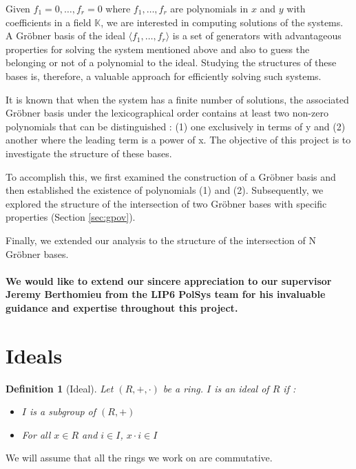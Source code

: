 \documentclass{article}
\newtheorem{definition}{Definition}[section]
\begin{document}
\par Given $f_{1}=0,\dots,f_{r}=0$ where $f_{1},\dots,f_{r}$ are polynomials in $x$ and $y$ with coefficients in a field $\mathbb{K}$, we are interested in computing solutions of the systems. A Gröbner basis of the ideal $\langle f_{1},\dots,f_{r} \rangle$ is a set of generators with advantageous properties for solving the system mentioned above and also to guess the belonging or not of a polynomial to the ideal. Studying the structures of these bases is, therefore, a valuable approach for efficiently solving such systems.
\par It is known that when the system has a finite number of solutions, the associated Gröbner basis under the lexicographical order contains at least two non-zero polynomials that can be distinguished : (1) one exclusively in terms of y and (2) another where the leading term is a power of x. The objective of this project is to investigate the structure of these bases.
\par To accomplish this, we first examined the construction of a Gröbner basis and then established the existence of polynomials (1) and (2). Subsequently, we explored the structure of the intersection of two Gröbner bases with specific properties (Section \ref{sec:gpov}). 
\par Finally, we extended our analysis to the structure of the intersection of N Gröbner bases. \\ \\

\textbf{We would like to extend our sincere appreciation to our supervisor Jeremy Berthomieu from the LIP6 PolSys  team for his invaluable guidance and expertise throughout this project.}

\newpage      

\section{Ideals}

\begin{definition}[Ideal]
    Let $(R, +, \cdot)$ be a ring. $I$ is an ideal of $R$ if : 
    \begin{itemize}
        \item $I$ is a subgroup of $(R, +)$
        \item For all $x \in R$ and $i \in I$, $x \cdot i \in I$
    \end{itemize}
\end{definition}

We will assume that all the rings we work on are commutative. 
\end{document}
